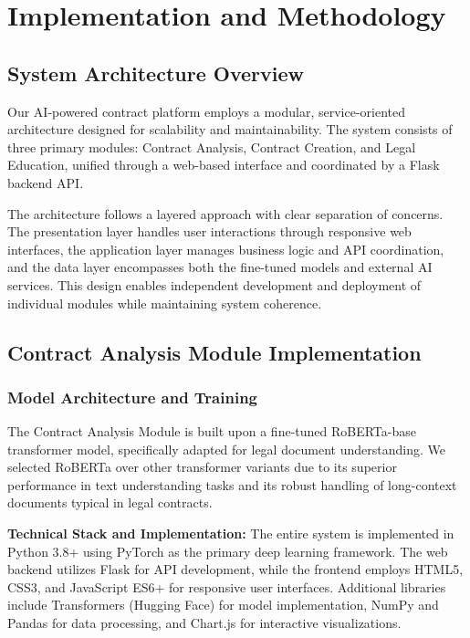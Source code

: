 \section{Implementation and Methodology}

\subsection{System Architecture Overview}

Our AI-powered contract platform employs a modular, service-oriented architecture designed for scalability and maintainability. The system consists of three primary modules: Contract Analysis, Contract Creation, and Legal Education, unified through a web-based interface and coordinated by a Flask backend API.

The architecture follows a layered approach with clear separation of concerns. The presentation layer handles user interactions through responsive web interfaces, the application layer manages business logic and API coordination, and the data layer encompasses both the fine-tuned models and external AI services. This design enables independent development and deployment of individual modules while maintaining system coherence.

\subsection{Contract Analysis Module Implementation}

\subsubsection{Model Architecture and Training}

The Contract Analysis Module is built upon a fine-tuned RoBERTa-base transformer model, specifically adapted for legal document understanding. We selected RoBERTa over other transformer variants due to its superior performance in text understanding tasks and its robust handling of long-context documents typical in legal contracts.

\textbf{Technical Stack and Implementation:} The entire system is implemented in Python 3.8+ using PyTorch as the primary deep learning framework. The web backend utilizes Flask for API development, while the frontend employs HTML5, CSS3, and JavaScript ES6+ for responsive user interfaces. Additional libraries include Transformers (Hugging Face) for model implementation, NumPy and Pandas for data processing, and Chart.js for interactive visualizations.

